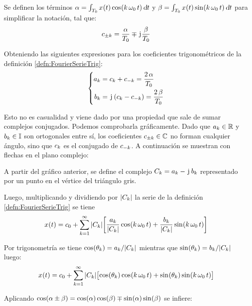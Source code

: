 Se definen los términos $\alpha = \int_{T_0} \fx[x]{t} \fx[\cos]{\kth \, \omega_0 \, t} \dif t$ y $\beta = \int_{T_0} \fx[x]{t} \fx[\sin]{\kth \, \omega_0 \, t} \dif t$ para simplificar la notación, tal que:
\[
     c_{\pm\kth} = \frac{\alpha}{T_0} \mp \iu \frac{\beta}{T_0}
\]

Obteniendo las siguientes expresiones para los coeficientes trigonométricos de la definición \ref{defn:FourierSerieTrig}:
\[
    \left\{
    \begin{aligned}
        a_\kth &= c_\kth + c_{-\kth} = \frac{2 \, \alpha}{T_0}
        \\
        b_\kth &= \iu \inParentheses{c_\kth - c_{-\kth}} = \frac{2 \, \beta}{T_0}
    \end{aligned}
    \right.
\]

Esto no es casualidad y viene dado por una propiedad que sale de sumar complejos conjugados.
Podemos comprobarla gráficamente.
Dado que $a_\kth \in \setR$ y $b_\kth \in \setI$ son ortogonales entre sí, los coeficientes $c_{\pm\kth} \in \setC$ no forman cualquier ángulo, sino que $c_\kth$ es el conjugado de $c_{-\kth}$.
A continuación se muestran con flechas en el plano complejo:

\begin{center}
    \def\svgwidth{0.6\linewidth}
    
\end{center}

A partir del gráfico anterior, se define el complejo $C_\kth = a_\kth - \iu \, b_\kth$ representado por un punto en el vértice del triángulo gris.

Luego, multiplicando y dividiendo por $\norm{C_\kth}$ la serie de la definición \ref{defn:FourierSerieTrig} se tiene
\[
    \fx[x]{t} = c_0 + \sum_{\kth=1}^{\infty} \norm{C_\kth} \inBrackets{ \dfrac{a_\kth}{\norm{C_\kth}} \fx[\cos]{\kth \, \omega_0 \, t} + \dfrac{b_\kth}{\norm{C_\kth}} \fx[\sin]{\kth \, \omega_0 \, t} }
\]

Por trigonometría se tiene $\fx[\cos]{\theta_\kth} = a_\kth / \norm{C_\kth}$ mientras que $\fx[\sin]{\theta_\kth} = b_\kth / \norm{C_\kth}$ luego:
\[
    \fx[x]{t} = c_0 + \sum_{\kth=1}^{\infty} \norm{C_\kth} \inBrackets{ \fx[\cos]{\theta_\kth} \fx[\cos]{\kth \, \omega_0 \, t} + \fx[\sin]{\theta_\kth} \fx[\sin]{\kth \, \omega_0 \, t} }
\]

Aplicando $\fx[\cos]{\alpha \pm \beta} = \fx[\cos]{\alpha} \fx[\cos]{\beta} \mp \fx[\sin]{\alpha} \fx[\sin]{\beta}$ se infiere:

